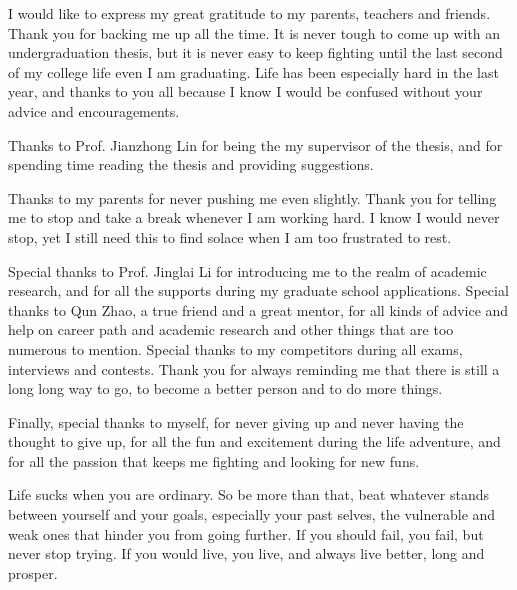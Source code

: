 
\begin{thanks}

I would like to express my great gratitude to my parents, teachers and friends.
Thank you for backing me up all the time.
It is never tough to come up with an undergraduation thesis,
but it is never easy to keep fighting until the last second of my college life even I am graduating.
Life has been especially hard in the last year,
and thanks to you all because I know I would be confused without your advice and encouragements.

Thanks to Prof. Jianzhong Lin for being the my supervisor of the thesis, 
and for spending time reading the thesis and providing suggestions.

Thanks to my parents for never pushing me even slightly.
Thank you for telling me to stop and take a break whenever I am working hard.
I know I would never stop, 
yet I still need this to find solace when I am too frustrated to rest.

Special thanks to Prof. Jinglai Li for introducing me to the realm of academic research,
and for all the supports during my graduate school applications.
Special thanks to Qun Zhao, 
a true friend and a great mentor,
for all kinds of advice and help on career path and academic research and 
other things that are too numerous to mention.
Special thanks to my competitors during all exams, interviews and contests.
Thank you for always reminding me that there is still a long long way to go,
to become a better person and to do more things.

Finally, special thanks to myself,
for never giving up and never having the thought to give up,
for all the fun and excitement during the life adventure,
and for all the passion that keeps me fighting and looking for new funs.

Life sucks when you are ordinary.
So be more than that,
beat whatever stands between yourself and your goals,
especially your past selves,
the vulnerable and weak ones that hinder you from going further.
If you should fail, you fail,
but never stop trying.
If you would live, you live,
and always live better, 
long and prosper.

% 
%

\end{thanks}

